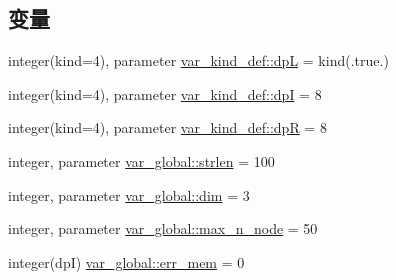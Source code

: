 \subsection*{变量}
\begin{DoxyCompactItemize}
\item 
integer(kind=4), parameter \hyperlink{namespacevar__kind__def_aa3b5571c2174e959545aafa1bd3fdaa8}{var\_\-kind\_\-def::dpL} = kind(.true.)
\item 
integer(kind=4), parameter \hyperlink{namespacevar__kind__def_adb3c90c729c1d40f3dfd28e762aa2b02}{var\_\-kind\_\-def::dpI} = 8
\item 
integer(kind=4), parameter \hyperlink{namespacevar__kind__def_a6f4f33a8b11a152a821a0ee8b1d6fa69}{var\_\-kind\_\-def::dpR} = 8
\item 
integer, parameter \hyperlink{namespacevar__global_afc73e7807a439bf3bc26589423ae3c91}{var\_\-global::strlen} = 100
\item 
integer, parameter \hyperlink{namespacevar__global_a6f0b7961ebb0eb949c22bc56c0b4065b}{var\_\-global::dim} = 3
\item 
integer, parameter \hyperlink{namespacevar__global_aaf3293fc78e326c60e3239dd8b665cb7}{var\_\-global::max\_\-n\_\-node} = 50
\item 
integer(dpI) \hyperlink{namespacevar__global_a5991406705b67a341f8f8b4619c270b4}{var\_\-global::err\_\-mem} = 0
\end{DoxyCompactItemize}



